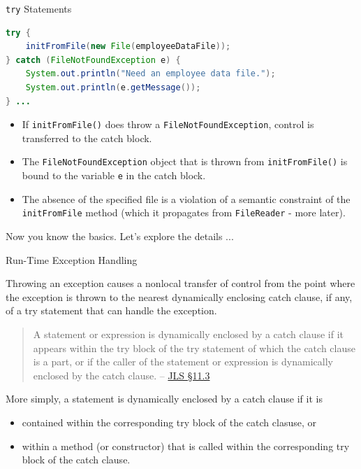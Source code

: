 \documentclass{beamer}
\begin{document}
\begin{frame}[fragile]{{\tt try} Statements}


\begin{lstlisting}[language=Java]
try {
    initFromFile(new File(employeeDataFile));
} catch (FileNotFoundException e) {
    System.out.println("Need an employee data file.");
    System.out.println(e.getMessage());
} ...
\end{lstlisting}

\begin{itemize}
\item If {\tt initFromFile()} does throw a {\tt FileNotFoundException}, control is transferred to the catch block.
\item The {\tt FileNotFoundException} object that is thrown from {\tt initFromFile()} is bound to the variable {\tt e} in the catch block.
\item The absence of the specified file is a violation of a semantic constraint of the {\tt initFromFile} method (which it propagates from {\tt FileReader} - more later).
\end{itemize}
Now you know the basics.  Let's explore the details ...

\end{frame}


\begin{frame}[fragile]{Run-Time Exception Handling}


Throwing an exception causes a nonlocal transfer of control from the point where the exception is thrown to the nearest dynamically enclosing catch clause, if any, of a try statement that can handle the exception.
\begin{quote}
A statement or expression is dynamically enclosed by a catch clause if it appears within the try block of the try statement of which the catch clause is a part, or if the caller of the statement or expression is dynamically enclosed by the catch clause. -- \href{http://docs.oracle.com/javase/specs/jls/se7/html/jls-11.html#jls-11.3}{JLS \S 11.3}
\end{quote}
More simply, a statement is dynamically enclosed by a catch clause if it is
\begin{itemize}
\item contained within the corresponding try block of the catch clasuse, or
\item  within a method (or constructor) that is called within the corresponding try block of the catch clause. 
\end{itemize}

\end{frame}
\end{document}
